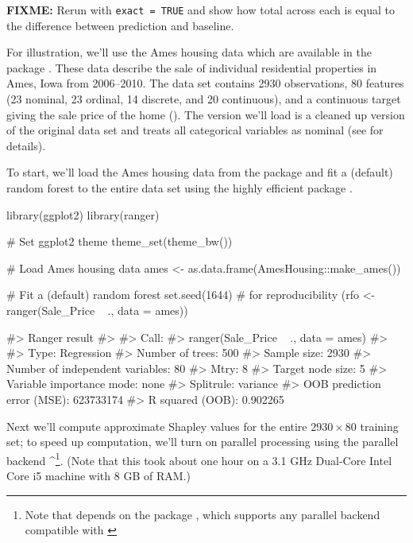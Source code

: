 \textbf{FIXME:} Rerun with \texttt{exact\ =\ TRUE} and show how total
across each is equal to the difference between prediction and baseline.

For illustration, we'll use the Ames housing data \citep{ames-cock-2011}
which are available in the  package
\citep{R-AmesHousing}. These data describe the sale of individual
residential properties in Ames, Iowa from 2006--2010. The data set
contains 2930 observations, 80 features (23 nominal, 23 ordinal, 14
discrete, and 20 continuous), and a continuous target giving the sale
price of the home (). The version we'll load is a
cleaned up version of the original data set and treats all categorical
variables as nominal (see  for details).

To start, we'll load the Ames housing data from the
 package \citep{R-AmesHousing} and fit a (default)
random forest to the entire data set using the highly efficient
 package \citep{R-ranger}.

\begin{Schunk}
\begin{Sinput}
library(ggplot2)
library(ranger)

# Set ggplot2 theme
theme_set(theme_bw())

# Load Ames housing data
ames <- as.data.frame(AmesHousing::make_ames())

# Fit a (default) random forest
set.seed(1644)  # for reproducibility
(rfo <- ranger(Sale_Price ~ ., data = ames))
\end{Sinput}
\begin{Soutput}
#> Ranger result
#> 
#> Call:
#>  ranger(Sale_Price ~ ., data = ames) 
#> 
#> Type:                             Regression 
#> Number of trees:                  500 
#> Sample size:                      2930 
#> Number of independent variables:  80 
#> Mtry:                             8 
#> Target node size:                 5 
#> Variable importance mode:         none 
#> Splitrule:                        variance 
#> OOB prediction error (MSE):       623733174 
#> R squared (OOB):                  0.902265
\end{Soutput}
\end{Schunk}

Next we'll compute approximate Shapley values for the entire
\(2930 \times 80\) training set; to speed up computation, we'll turn on
parallel processing using the  parallel backend
\citep{R-doParallel}\^{}\footnote{Note that  depends on the  package \citep{R-plyr}, which supports any parallel backend compatible with  \citep{R-foreach}}.
(Note that this took about one hour on a 3.1 GHz Dual-Core Intel Core i5
machine with 8 GB of RAM.)

